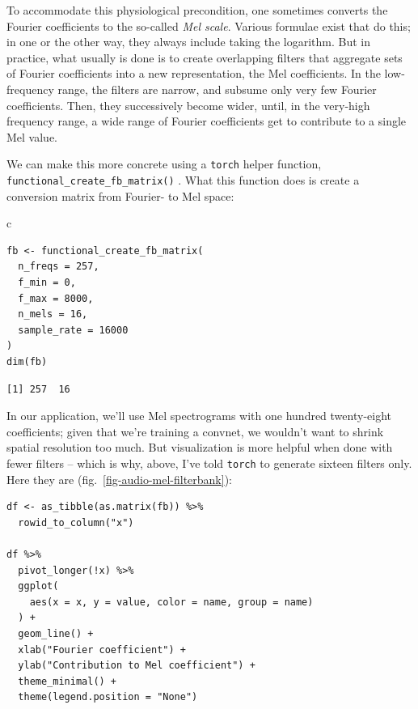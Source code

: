 \documentclass[
  letterpaper,
]{krantz}
\begin{document}
To accommodate this physiological precondition, one sometimes converts
the Fourier coefficients to the so-called \emph{Mel scale}. Various
formulae exist that do this; in one or the other way, they always
include taking the logarithm. But in practice, what usually is done is
to create overlapping filters that aggregate sets of Fourier
coefficients into a new representation, the Mel coefficients. In the
low-frequency range, the filters are narrow, and subsume only very few
Fourier coefficients. Then, they successively become wider, until, in
the very-high frequency range, a wide range of Fourier coefficients get
to contribute to a single Mel value.

We can make this more concrete using a \texttt{torch} helper function,
\texttt{functional\_create\_fb\_matrix()} . What this function does is
create a conversion matrix from Fourier- to Mel space:

c

\begin{verbatim}
fb <- functional_create_fb_matrix(
  n_freqs = 257,
  f_min = 0,
  f_max = 8000,
  n_mels = 16,
  sample_rate = 16000
)
dim(fb)
\end{verbatim}

\begin{verbatim}
[1] 257  16
\end{verbatim}

In our application, we'll use Mel spectrograms with one hundred
twenty-eight coefficients; given that we're training a convnet, we
wouldn't want to shrink spatial resolution too much. But visualization
is more helpful when done with fewer filters -- which is why, above,
I've told \texttt{torch} to generate sixteen filters only. Here they are
(fig.~\ref{fig-audio-mel-filterbank}):

\begin{verbatim}
df <- as_tibble(as.matrix(fb)) %>%
  rowid_to_column("x")

df %>%
  pivot_longer(!x) %>%
  ggplot(
    aes(x = x, y = value, color = name, group = name)
  ) +
  geom_line() +
  xlab("Fourier coefficient") +
  ylab("Contribution to Mel coefficient") +
  theme_minimal() +
  theme(legend.position = "None")
\end{verbatim}
\end{document}
